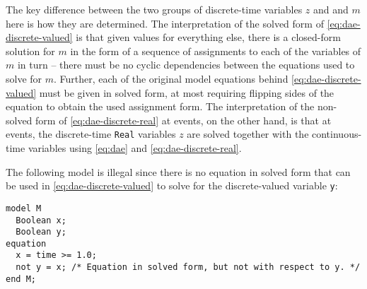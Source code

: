 The key difference between the two groups of discrete-time variables $z$ and and $m$ here is how they are determined.
The interpretation of the solved form of \eqref{eq:dae-discrete-valued} is that given values for everything else, there is a closed-form solution for $m$ in the form of a sequence of assignments to each of the variables of $m$ in turn -- there must be no cyclic dependencies between the equations used to solve for $m$.
Further, each of the original model equations behind \eqref{eq:dae-discrete-valued} must be given in solved form, at most requiring flipping sides of the equation to obtain the used assignment form.
The interpretation of the non-solved form of \eqref{eq:dae-discrete-real} at events, on the other hand, is that at events, the discrete-time \lstinline!Real! variables $z$ are solved together with the continuous-time variables using \eqref{eq:dae} and \eqref{eq:dae-discrete-real}.

\begin{example}
The following model is illegal since there is no equation in solved form that can be used in \eqref{eq:dae-discrete-valued} to solve for the discrete-valued variable \lstinline!y!:
\begin{lstlisting}[language=modelica]
model M
  Boolean x;
  Boolean y;
equation
  x = time >= 1.0;
  not y = x; /* Equation in solved form, but not with respect to y. */
end M;
\end{lstlisting}
\end{example}

